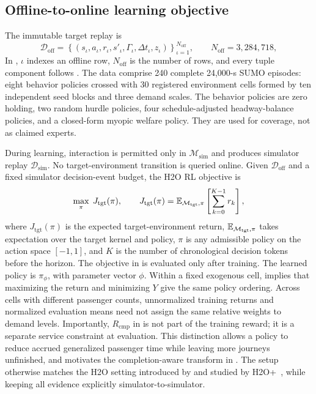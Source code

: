 \subsection{Offline-to-online learning objective}
\label{sec:problem:objective}

The immutable target replay is
\begin{equation}
\mathcal{D}_{\mathrm{off}}=
\left\{(s_{\iota},a_{\iota},r_{\iota},s'_{\iota},
\Gamma_{\iota},\Delta t_{\iota},z_{\iota})\right\}_{\iota=1}^{N_{\mathrm{off}}},
\qquad N_{\mathrm{off}}=3{,}284{,}718,
\label{eq:v7_dataset}
\end{equation}
In , $\iota$ indexes an offline row,
$N_{\mathrm{off}}$ is the number of rows, and every tuple component follows
. The data comprise
240 complete 24,000-s SUMO episodes: eight behavior policies crossed with 30
registered environment cells formed by ten independent seed blocks and three
demand scales. The behavior policies are zero holding, two random hurdle policies,
four schedule-adjusted headway-balance policies, and a closed-form myopic
welfare policy. They are used for coverage, not as claimed experts.

During learning, interaction is permitted only in
$\mathcal{M}_{\mathrm{sim}}$ and produces simulator replay
$\mathcal{D}_{\mathrm{sim}}$. No target-environment transition is queried
online. Given $\mathcal{D}_{\mathrm{off}}$ and a fixed simulator decision-event
budget, the H2O RL objective is
\begin{equation}
\max_{\pi}\;J_{\mathrm{tgt}}(\pi),
\qquad
J_{\mathrm{tgt}}(\pi)=
\mathbb{E}_{\mathcal{M}_{\mathrm{tgt}},\pi}
\left[\sum_{k=0}^{K-1}r_k\right],
\label{eq:v7_objective}
\end{equation}
where $J_{\mathrm{tgt}}(\pi)$ is the expected target-environment return,
$\mathbb{E}_{\mathcal{M}_{\mathrm{tgt}},\pi}$ takes expectation over the target kernel
and policy, $\pi$ is any admissible policy on the action space $[-1,1]$,
and $K$ is the number of
chronological decision tokens before the horizon. The objective in
 is evaluated only after training. The learned policy is
$\pi_{\phi}$, with parameter vector $\phi$.
Within a fixed exogenous cell,  implies that maximizing the
return and minimizing $Y$ give the same policy ordering. Across cells with
different passenger counts, unnormalized training returns and normalized
evaluation means need not assign the same relative weights to demand levels.
Importantly,
$R_{\mathrm{cmp}}$ in  is not part of the training
reward; it is a separate service constraint at evaluation. This distinction
allows a policy to reduce accrued generalized passenger time while leaving more
journeys unfinished, and motivates the completion-aware transform in
. The setup otherwise matches the H2O setting
introduced by \citet{niu2022h2o} and studied by H2O+~\citep{niu2025h2oplus},
while keeping all evidence explicitly simulator-to-simulator.
